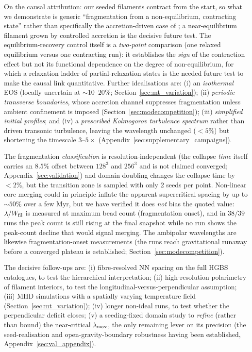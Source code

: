 \documentclass[usenatbib,twoside,twocolumn]{mnras}
\begin{document}
On the causal attribution: our seeded filaments contract from the start, so what we demonstrate is generic ``fragmentation from a non-equilibrium, contracting state'' rather than specifically the accretion-driven case of \citet{Clarke2016,Clarke2017}; a near-equilibrium filament grown by controlled accretion is the decisive future test. The equilibrium-recovery control itself is a \emph{two-point} comparison (one relaxed equilibrium versus one contracting run): it establishes the \emph{sign} of the contraction effect but not its functional dependence on the degree of non-equilibrium, for which a relaxation ladder of partial-relaxation states is the needed future test to make the causal link quantitative. Further idealisations are: (i) an \emph{isothermal} EOS (locally uncertain at $\sim10$--$20\%$; Section~\ref{sec:mt_variation}); (ii) \emph{periodic transverse boundaries}, whose accretion channel suppresses fragmentation unless ambient confinement is imposed (Section~\ref{sec:modecompetition}); (iii) \emph{simplified initial profiles}; and (iv) a \emph{prescribed Kolmogorov turbulence spectrum} rather than driven transonic turbulence, leaving the wavelength unchanged ($<5\%$) but shortening the timescale $3$--$5\times$ (Appendix~\ref{sec:supplementary_campaigns}).

The fragmentation \emph{classification} is resolution-independent (the collapse \emph{time} itself carries an $8.5\%$ offset between $128^3$ and $256^3$ and is not claimed converged; Appendix~\ref{sec:validation}) and domain-doubling changes the collapse time by $<2\%$, but the transition zone is sampled with only 2 seeds per point. Non-linear core merging could in principle inflate the apparent supercritical spacing by up to $\sim50\%$ over a few Myr, but we have verified it does \emph{not} bias the quoted value: $\lambda/W_{\rm fil}$ is measured at maximum bead count (fragmentation onset), and in $38/39$ runs the peak count is still rising at the final snapshot while no run shows the peak-count decline that would signal merging. The ambipolar wavelengths are likewise fragmentation-onset measurements (the runs reach gravitational runaway before a converged plateau is established; Section~\ref{sec:modecompetition}).

The decisive follow-ups are: (i) fibre-resolved NN spacing on the full HGBS catalogues, to test the hierarchical interpretation; (ii) high-resolution polarimetry of filament interiors, to test the longitudinal-versus-perpendicular assumption; (iii) MHD simulations with a spatially varying temperature field (Section~\ref{sec:mt_variation}); (iv) longer non-ideal runs, to test whether the perpendicular deficit closes; (v) a seeding-fixed domain study to \emph{refine} (rather than bound) the near-critical $\lambda_{\rm max}$, the only remaining lever on its precision (the seed-realisation and open-gravity-boundary robustness having been established, Appendix~\ref{sec:val_appendix}).
\end{document}
